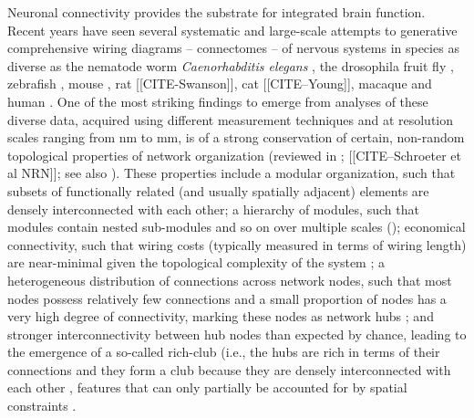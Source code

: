 \documentclass[10pt,letterpaper]{article}
\begin{document}
Neuronal connectivity provides the substrate for integrated brain function.
Recent years have seen several systematic and large-scale attempts to generative comprehensive wiring diagrams -- connectomes -- of nervous systems in species as diverse as the nematode worm \emph{Caenorhabditis elegans} \cite{White:1986tx, Varshney2011}, the drosophila fruit fly \cite{Chiang:2011, Shih:2015cu}, zebrafish \cite{Wanner:2016ea, Hildebrand:2017iu}, mouse \cite{Oh2014, Zingg:2014el}, rat [[CITE-Swanson]], cat [[CITE--Young]], macaque \cite{Markov:2012wu, Stephan2001} and human \cite{Hagmann:2008gda, VanEssen2013a}.
One of the most striking findings to emerge from analyses of these diverse data, acquired using different measurement techniques and at resolution scales ranging from nm to mm, is of a strong conservation of certain, non-random topological properties of network organization (reviewed in \cite{Bullmore:2009iv, Bullmore:2012vl, Sporns2011,VandenHeuvel2016a}; [[CITE--Schroeter et al NRN]]; see also \cite{fornito2016book}).
These properties include a modular organization, such that subsets of functionally related (and usually spatially adjacent) elements are densely interconnected with each other;
a hierarchy of modules, such that modules contain nested sub-modules and so on over multiple scales (\cite{Meunier:2010hq, Bassett2010});
economical connectivity, such that wiring costs (typically measured in terms of wiring length) are near-minimal given the topological complexity of the system \cite{Betzel:2016jt, Bassett:2010hf};
a heterogeneous distribution of connections across network nodes, such that most nodes possess relatively few connections and a small proportion of nodes has a very high degree of connectivity, marking these nodes as network hubs \cite{vandenHeuvel:2013ge, Varshney:2011ju};
and stronger interconnectivity between hub nodes than expected by chance, leading to the emergence of a so-called rich-club (i.e., the hubs are rich in terms of their connections and they form a club because they are densely interconnected with each other \cite{vandenHeuvel:2011he, ZamoraLopez:2010hy, deReus:2013cy, Towlson:2013gf, Shih:2015cu}, features that can only partially be accounted for by spatial constraints \cite{Henderson:2014fg, Roberts:2016il, Horvat:2016ia}.
\end{document}
